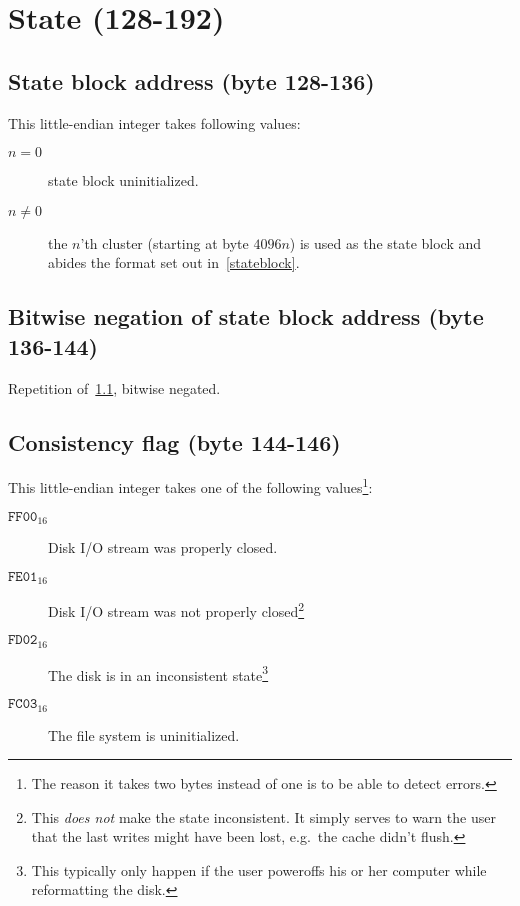 \documentclass[11pt,a4paper]{report}
\newcommand{\clustersize}{4096 }
\begin{document}
        \section{State (128-192)}
        \subsection{State block address (byte 128-136)}
        \label{header:stateblock}
        This little-endian integer takes following values:

        \begin{description}
            \item [$n = 0$]    state block uninitialized.
            \item [$n \neq 0$] the $n$'th cluster
                (starting at byte $\clustersize n$) is used
                as the state block and abides the format set out
                in~\ref{stateblock}.
        \end{description}

        \subsection{Bitwise negation of state block address (byte 136-144)}
        Repetition of~\ref{header:stateblock}, bitwise negated.

        \subsection{Consistency flag (byte 144-146)}
        \label{header:consistency}
        This little-endian integer takes one of the following
        values\footnote{The reason it takes two bytes instead of one is to be
        able to detect errors.}:

        \begin{description}
            \item [$\texttt{FF00}_{16}$] Disk I/O stream was properly closed.
            \item [$\texttt{FE01}_{16}$] Disk I/O stream was not properly
                closed\footnote{This \emph{does not} make the state
                inconsistent. It simply serves to warn the user that the last
                writes might have been lost, e.g.\ the cache didn't flush.}
            \item [$\texttt{FD02}_{16}$] The disk is in an inconsistent
                state\footnote{This typically only happen if the user poweroffs
                his or her computer while reformatting the disk.}
            \item [$\texttt{FC03}_{16}$] The file system is uninitialized.
        \end{description}
\end{document}
